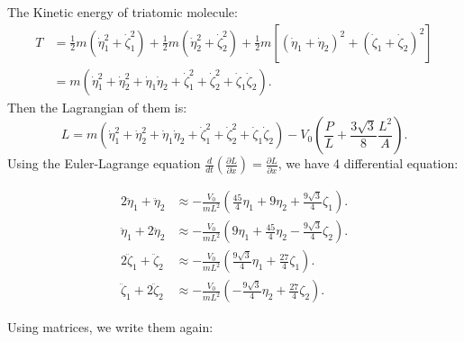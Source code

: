 \documentclass[12pt]{article}
\begin{document}
\noindent The Kinetic energy of triatomic molecule:
\begin{align*}
	T & = \frac{1}{2} m \left( \dot{\eta}_1^2 + \dot{\zeta}_1^2 \right) + \frac{1}{2} m \left( \dot{\eta}_2^2 + \dot{\zeta}_2^2 \right) + \frac{1}{2} m \left[ \left( \dot{\eta}_1 + \dot{\eta}_2 \right)^2 + \left( \dot{\zeta}_1 + \dot{\zeta}_2 \right)^2 \right] \\
	& = m \left( \dot{\eta}_1^2 + \dot{\eta}_2^2 + \dot{\eta}_1 \dot{\eta}_2 + \dot{\zeta}_1^2 + \dot{\zeta}_2^2 + \dot{\zeta}_1 \dot{\zeta}_2 \right) .
\end{align*}
\noindent Then the Lagrangian of them is:
$$ L = m \left( \dot{\eta}_1^2 + \dot{\eta}_2^2 + \dot{\eta}_1 \dot{\eta}_2 + \dot{\zeta}_1^2 + \dot{\zeta}_2^2 + \dot{\zeta}_1 \dot{\zeta}_2 \right) - V_0 \left( \frac{P}{L} + \frac{3 \sqrt{3} }{8} \frac{L^2}{A} \right) .$$
\noindent Using the Euler-Lagrange equation $ \frac{d}{dt} \left( \frac{\partial L}{\partial \dot{x} } \right) = \frac{ \partial L}{\partial x} $, we have 4 differential equation: 

\begin{align*}
	2 \ddot{\eta}_1 + \ddot{\eta}_2 & \approx - \frac{V_0}{mL^2} \left( \frac{45}{4} \eta_1 + 9 \eta_2 + \frac{9\sqrt{3}}{4} \zeta_1 \right) . \\
	\ddot{\eta}_1 + 2 \ddot{\eta}_2 & \approx - \frac{V_0}{mL^2} \left( 9 \eta_1 + \frac{45}{4} \eta_2 - \frac{9\sqrt{3}}{4} \zeta_2 \right) . \\
	2 \ddot{\zeta}_1 + \ddot{\zeta}_2 & \approx - \frac{V_0}{mL^2} \left( \frac{9\sqrt{3}}{4} \eta_1 + \frac{27}{4} \zeta_1 \right) . \\
	\ddot{\zeta}_1 + 2 \ddot{\zeta}_2 & \approx - \frac{V_0}{mL^2} \left( - \frac{9\sqrt{3}}{4} \eta_2 + \frac{27}{4} \zeta_2 \right) .
\end{align*}	

\noindent Using matrices, we write them again:
\end{document}

